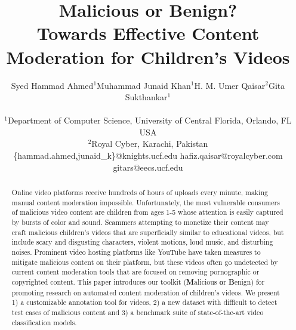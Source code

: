 \documentclass[letterpaper]{article}
\begin{document}
\title{Malicious or Benign?\\ Towards Effective Content Moderation for Children's Videos}
\author{
\begin{tabular}{llll}
Syed Hammad Ahmed$^1$ & Muhammad Junaid Khan$^1$ & H. M. Umer Qaisar$^2$ & Gita Sukthankar$^1$\\
\end{tabular}
\\
$^1$Department of Computer Science, University of Central Florida, Orlando, FL USA\\
$^2$Royal Cyber,  Karachi, Pakistan\\
\{hammad.ahmed,junaid\_k\}@knights.ucf.edu \quad hafiz.qaisar@royalcyber.com \quad gitars@eecs.ucf.edu\\ 
}

\maketitle

\begin{abstract}
Online video platforms receive hundreds of hours of uploads every minute, making manual content moderation impossible.   
Unfortunately, the most vulnerable consumers of malicious video content are children from ages 1-5 whose attention is easily captured by bursts of color and sound.   Scammers attempting to monetize their content may craft malicious children's videos that are superficially similar to educational videos, but include scary and disgusting characters, violent motions, loud music, and disturbing noises.   Prominent video hosting platforms like YouTube have taken measures to mitigate malicious content on their platform, but these videos often go undetected by current content moderation tools that are focused on removing pornographic or copyrighted content.  This paper introduces our toolkit (\textbf{M}alicious \textbf{o}r \textbf{B}enign) for promoting research on automated content moderation of children's videos.
We present 1) a customizable annotation tool for videos, 2) a new dataset with difficult to detect test cases of malicious content and 3) a benchmark suite of state-of-the-art video classification models. 
\end{abstract}
\end{document}

